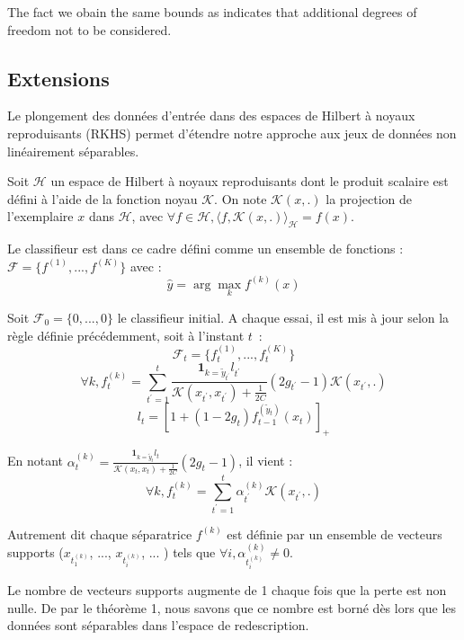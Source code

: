 \documentclass[preprint,12pt,authoryear]{elsarticle}
\begin{document}
The fact we obain the same bounds as \cite{crammer2006online} indicates that additional degrees of freedom not to be considered.   

\subsection{Extensions}
Le plongement des données d'entrée dans des espaces de Hilbert à noyaux reproduisants (RKHS) permet d'étendre notre approche aux jeux de données non linéairement séparables. 

Soit $\mathcal{H}$ un espace de Hilbert à noyaux reproduisants dont le produit scalaire est défini à l'aide de la fonction noyau $\mathcal{K}$. On note $\mathcal{K}(x,.)$ la projection de l'exemplaire $x$ dans $\mathcal{H}$, avec $\forall f \in \mathcal{H}, \langle f,\mathcal{K}(x,.)\rangle_\mathcal{H} = f(x) $.


Le classifieur est dans ce cadre défini comme un ensemble de fonctions : $\mathcal{F} = \{f^{(1)}, ..., f^{(K)}\}$ avec :
$$\hat{y} = \arg \max_k f^{(k)}(x)$$

Soit $\mathcal{F}_0=\{0, ..., 0\}$ le classifieur initial. A chaque essai, il est mis à jour selon la règle définie précédemment, soit à l'instant $t$~:
$$\mathcal{F}_t = \{f^{(1)}_t, ..., f^{(K)}_t\}$$
$$\forall k, f^{(k)}_t = \sum_{t^\prime = 1} ^t  \frac {\mathbf{1}_{k=\tilde{y}_{t^\prime}}l_{t^\prime}}{\mathcal{K}(x_{t^\prime},x_{t^\prime})+\frac{1}{2C}} (2g_{t^\prime} - 1)\mathcal{K}(x_{t^\prime},.)$$
$$ l_t = [1 + (1-2g_t) f_{t-1}^{(\tilde{y}_t)}(x_t)]_+$$

En notant $\alpha_t^{(k)} = \frac {\mathbf{1}_{k=\tilde{y}_{t}}l_{t}}{\mathcal{K}(x_{t},x_{t})+\frac{1}{2C}} (2g_{t} - 1)$, il vient :
$$\forall k, f^{(k)}_t = \sum_{t^\prime = 1} ^t \alpha_{t^\prime}^{(k)} \mathcal{K}(x_{t^\prime},.)$$

Autrement dit chaque séparatrice $f^{(k)}$ est définie par un ensemble de vecteurs supports ($x_{t_1^{(k)}}$, ..., $x_{t_i^{(k)}}$, ...  ) tels que $\forall i, \alpha_{t_i^{(k)}}^{(k)} \neq 0$.


Le nombre de vecteurs supports augmente de 1 chaque fois que la perte est non nulle. De par le théorème 1, nous savons que ce nombre est borné dès lors que les données sont séparables dans l'espace de redescription. 



\end{document}
